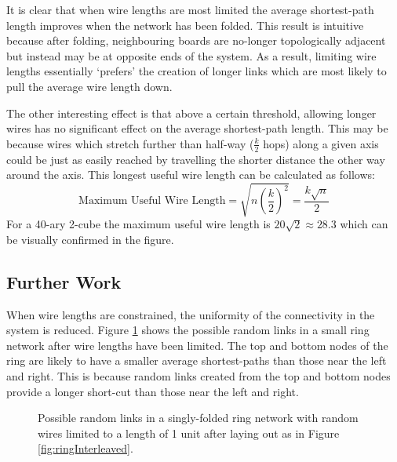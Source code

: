 			It is clear that when wire lengths are most limited the average
			shortest-path length improves when the network has been folded. This
			result is intuitive because after folding, neighbouring boards are
			no-longer topologically adjacent but instead may be at opposite ends of
			the system. As a result, limiting wire lengths essentially `prefers' the
			creation of longer links which are most likely to pull the average wire
			length down.
			
			The other interesting effect is that above a certain threshold, allowing
			longer wires has no significant effect on the average shortest-path
			length. This may be because wires which stretch further than half-way
			($\frac{k}{2}$ hops) along a given axis could be just as easily reached by
			travelling the shorter distance the other way around the axis. This
			longest useful wire length can be calculated as follows:
			\[
				\textrm{Maximum Useful Wire Length}
					= \sqrt{n \left({\frac{k}{2}}\right)^2}
					= \frac{k\sqrt{n}}{2}
			\]
			For a 40-ary 2-cube the maximum useful wire length is $20\sqrt{2} \approx
			28.3$ which can be visually confirmed in the figure.
		
		\subsection{Further Work}
			
			
			When wire lengths are constrained, the uniformity of the connectivity in
			the system is reduced. Figure \ref{fig:ringNetworkLimitedWires} shows the
			possible random links in a small ring network after wire lengths have been
			limited. The top and bottom nodes of the ring are likely to have a smaller
			average shortest-paths than those near the left and right. This is because
			random links created from the top and bottom nodes provide a longer
			short-cut than those near the left and right.
			
			\begin{figure}
				\center
				
				\caption[Possible random links in a singly-folded ring network with
				short wires.]{Possible random links in a singly-folded ring network with
				random wires limited to a length of 1 unit after laying out as in Figure
				\ref{fig:ringInterleaved}.}
				\label{fig:ringNetworkLimitedWires}
			\end{figure}
			
